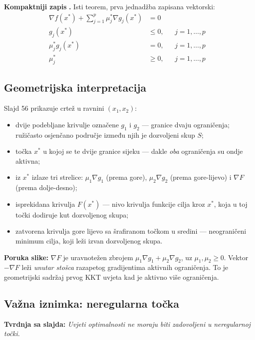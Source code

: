 \textbf{Kompaktniji zapis} \textbf{.} Isti teorem, prva jednadžba
zapisana vektorski:
\begin{align}
\nabla f(x^{*}) + \sum_{j=1}^{p}\mu_j^{*}\nabla g_j(x^{*}) &= 0 \\
g_j(x^{*}) &\le 0, && j = 1,\dots,p \\
\mu_j^{*}g_j(x^{*}) &= 0, && j = 1,\dots,p \\
\mu_j^{*} &\ge 0, && j = 1,\dots,p
\end{align}

\subsection{Geometrijska interpretacija}

Slajd 56 prikazuje crtež u ravnini $(x_1, x_2)$:

\begin{itemize}
  \item dvije podebljane krivulje označene $g_1$ i $g_2$ --- granice dvaju
        ograničenja; ružičasto osjenčano područje između njih je dozvoljeni skup
        $S$;
  \item točka $x^{*}$ u kojoj se te dvije granice sijeku --- dakle \emph{oba}
        ograničenja su ondje aktivna;
  \item iz $x^{*}$ izlaze tri strelice: $\mu_1\nabla g_1$ (prema gore),
        $\mu_2\nabla g_2$ (prema gore-lijevo) i $\nabla F$ (prema dolje-desno);
  \item isprekidana krivulja $F(x^{*})$ --- nivo krivulja funkcije cilja kroz
        $x^{*}$, koja u toj točki dodiruje kut dozvoljenog skupa;
  \item zatvorena krivulja gore lijevo sa šrafiranom točkom u sredini ---
        neograničeni minimum cilja, koji leži izvan dozvoljenog skupa.
\end{itemize}

\textbf{Poruka slike:} $\nabla F$ je uravnotežen zbrojem $\mu_1\nabla g_1 +
\mu_2\nabla g_2$, uz $\mu_1,\mu_2 \ge 0$. Vektor $-\nabla F$ leži \emph{unutar
stošca} razapetog gradijentima aktivnih ograničenja. To je geometrijski sadržaj
prvog KKT uvjeta kad je aktivno više ograničenja.

\subsection{Važna iznimka: neregularna točka}

\textbf{Tvrdnja sa slajda:} \emph{Uvjeti optimalnosti ne moraju biti zadovoljeni
u neregularnoj točki.}

